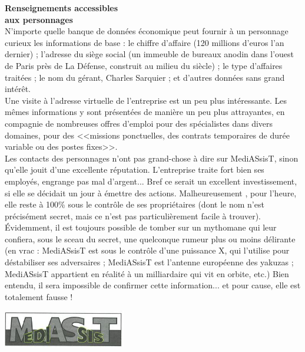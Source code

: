 \documentclass[11pt,twoside,a4paper]{article}
\begin{document}
\begin{multicols}{2}
\vfill
\columnbreak

\textbf{\Large Renseignements accessibles ~\\ aux personnages}~\\
N'importe quelle banque de donn{\'e}es {\'e}conomique peut fournir  {\`a} un personnage curieux les informations de base : le chiffre d'affaire (120 millions d'euros l'an dernier) ; l'adresse du si{\`e}ge social (un immeuble de bureaux anodin dans l'ouest de Paris pr{\`e}s de La D{\'e}fense, construit au milieu du si{\`e}cle) ; le type d'affaires trait{\'e}es ; le nom du g{\'e}rant, Charles Sarquier ; et d'autres donn{\'e}es sans grand int{\'e}r{\^e}t. ~\\
Une visite {\`a} l'adresse virtuelle de l'entreprise est un peu plus int{\'e}ressante. Les m{\^e}mes informations y sont pr{\'e}sent{\'e}es de mani{\`e}re un peu plus attrayantes, en compagnie de nombreuses offres d'emploi pour des sp{\'e}cialistes dans divers domaines, pour des <<missions ponctuelles, des contrats temporaires de dur{\'e}e variable ou des postes fixes>>. ~\\
Les contacts des personnages n'ont pas grand-chose {\`a} dire sur MediASsisT, sinon qu'elle jouit d'une excellente r{\'e}putation. L'entreprise traite fort bien ses employ{\'e}s, engrange pas mal d'argent... Bref ce serait un excellent investissement, si elle se d{\'e}cidait un jour {\`a} {\'e}mettre des actions. Malheureusement , pour l'heure, elle reste {\`a} 100\% sous le contr{\^o}le de ses propri{\'e}taires (dont le nom n'est pr{\'e}cis{\'e}ment secret, mais ce n'est pas particuli{\`e}rement facile {\`a} trouver). {\'E}videmment, il est toujours possible de tomber sur un mythomane qui leur confiera, sous le sceau du secret, une quelconque rumeur plus ou moins d{\'e}lirante (en vrac : MediASsisT est sous le contr{\^o}le d'une puissance X, qui l'utilise pour d{\'e}stabiliser ses adversaires ; MediASsisT est l'antenne europ{\'e}enne des yakuzas ; MediASsisT appartient en r{\'e}alit{\'e} {\`a} un milliardaire qui vit en orbite, etc.) Bien entendu, il sera impossible de confirmer cette information... et pour cause, elle est totalement fausse ! %

\begin{center} \includegraphics[width=0.40\textwidth]{img/MASTMediASsisT.jpg} \end{center}


\end{multicols}
\end{document}
